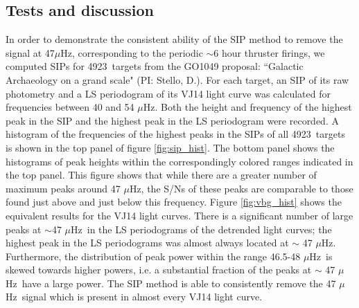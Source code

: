\documentclass[useAMS, usenatbib, preprint, 12pt]{aastex}
\newcommand{\nGO}{4923}
\newcommand{\uHz}{$\mu$Hz}
\begin{document}
\subsection{Tests and discussion}

In order to demonstrate the consistent ability of the SIP method
to remove the signal at 47\uHz, corresponding to the periodic $\sim$6 hour
thruster firings, we computed SIPs for \nGO\ targets from the GO1049
proposal: ``Galactic Archaeology on a grand scale" (PI: Stello, D.).
For each target, an SIP of its raw photometry and a LS periodogram of its
VJ14 light curve was calculated for frequencies between
40 and 54 \uHz.
Both the height and frequency of the highest peak in the SIP and the highest
peak in the LS periodogram were recorded.
A histogram of the frequencies of the highest peaks in the SIPs of all \nGO\
targets is shown in the top panel of figure \ref{fig:sip_hist}.
The bottom panel shows the histograms of peak heights within the
correspondingly colored ranges indicated in the top panel.
This figure shows that while there are a greater number of maximum peaks
around 47 \uHz, the S/Ns of these peaks are comparable to those found just
above and just below this frequency.
Figure \ref{fig:vbg_hist} shows the equivalent results for the
VJ14 light curves.
There is a significant number of large peaks at $\sim$47 \uHz\ in the LS
periodograms of the detrended light curves; the highest peak in the LS
periodograms was almost always located at $\sim$ 47 \uHz.
Furthermore, the distribution of peak power within the range 46.5-48 \uHz\ is
skewed towards higher powers, i.e. a substantial fraction of the peaks at
$\sim$ 47 \uHz\ have a large power.
The SIP method is able to consistently remove the 47 \uHz\ signal which is
present in almost every VJ14 light curve.
\end{document}
